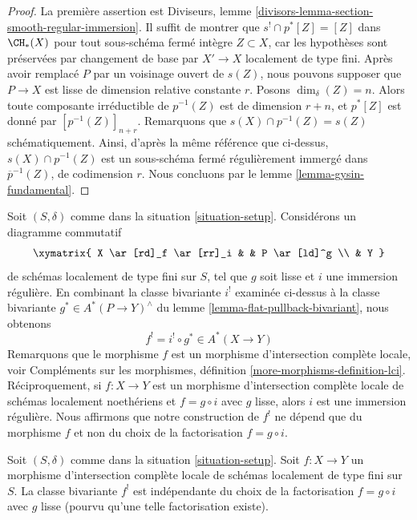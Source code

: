 \begin{proof}
La première assertion est Diviseurs, lemme
\ref{divisors-lemma-section-smooth-regular-immersion}.
Il suffit de montrer que $s^! \cap p^*[Z] = [Z]$ dans
$\CH_*(X)$ pour tout sous-schéma fermé intègre $Z \subset X$,
car les hypothèses sont préservées par changement de base par $X' \to X$
localement de type fini. Après avoir remplacé $P$ par un voisinage ouvert
de $s(Z)$, nous pouvons supposer que $P \to X$ est lisse de dimension relative constante $r$.
Posons $\dim_\delta(Z) = n$. Alors toute composante irréductible de $p^{-1}(Z)$
est de dimension $r + n$, et $p^*[Z]$ est donné par $[p^{-1}(Z)]_{n + r}$.
Remarquons que $s(X) \cap p^{-1}(Z) = s(Z)$ schématiquement. Ainsi, d'après la
même référence que ci-dessus, $s(X) \cap p^{-1}(Z)$ est un sous-schéma fermé
régulièrement immergé dans $\overline{p}^{-1}(Z)$, de codimension $r$.
Nous concluons par le lemme \ref{lemma-gysin-fundamental}.
\end{proof}

\noindent
Soit $(S, \delta)$ comme dans la situation \ref{situation-setup}. Considérons un
diagramme commutatif
$$
\xymatrix{
X \ar[rd]_f \ar[rr]_i & & P \ar[ld]^g \\
& Y
}
$$
de schémas localement de type fini sur $S$, tel que $g$ soit lisse
et $i$ une immersion régulière. En combinant la classe bivariante
$i^!$ examinée ci-dessus à la classe bivariante $g^* \in A^*(P \to Y)^\wedge$
du lemme \ref{lemma-flat-pullback-bivariant}, nous obtenons
$$
f^! = i^! \circ g^* \in A^*(X \to Y)
$$
Remarquons que le morphisme $f$ est un morphisme d'intersection complète locale, voir
Compléments sur les morphismes, définition \ref{more-morphisms-definition-lci}.
Réciproquement, si $f : X \to Y$ est un morphisme d'intersection complète locale
de schémas localement noethériens et $f = g \circ i$ avec $g$ lisse, alors
$i$ est une immersion régulière. Nous affirmons que notre construction de $f^!$
ne dépend que du morphisme $f$ et non du choix de la factorisation
$f = g \circ i$.

\begin{lemma}
\label{lemma-lci-gysin-well-defined}
Soit $(S, \delta)$ comme dans la situation \ref{situation-setup}.
Soit $f : X \to Y$ un morphisme d'intersection complète locale
de schémas localement de type fini sur $S$.
La classe bivariante $f^!$ est indépendante du choix de
la factorisation $f = g \circ i$ avec $g$ lisse (pourvu
qu'une telle factorisation existe).
\end{lemma}

